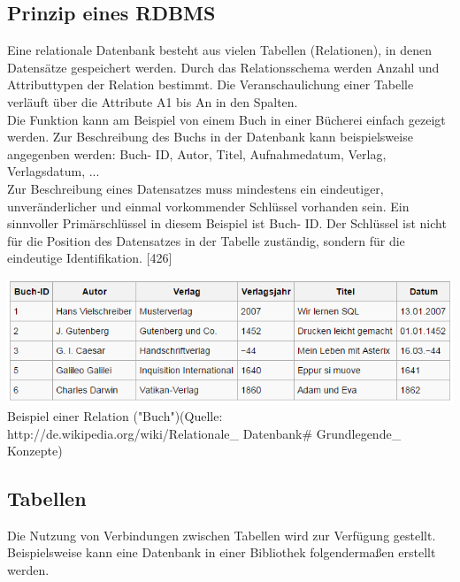 \documentclass[12pt,a4paper]{report}
\begin{document}
\begin{onehalfspace}
\subsection{Prinzip eines RDBMS}
Eine relationale Datenbank besteht aus vielen Tabellen (Relationen), in denen Datensätze gespeichert werden. Durch das Relationsschema werden Anzahl und Attributtypen der Relation bestimmt. Die Veranschaulichung einer Tabelle verläuft über die Attribute A1 bis An in den Spalten.\\

Die Funktion kann am Beispiel von einem Buch in einer Bücherei einfach gezeigt werden. Zur Beschreibung des Buchs in der Datenbank kann beispielsweise angegenben werden: Buch- ID, Autor, Titel, Aufnahmedatum, Verlag, Verlagsdatum, ...
\\Zur Beschreibung eines Datensatzes muss mindestens ein eindeutiger, unveränderlicher und einmal vorkommender Schlüssel vorhanden sein. Ein sinnvoller Primärschlüssel in diesem Beispiel ist Buch- ID. Der Schlüssel ist nicht für die Position des Datensatzes in der Tabelle zuständig, sondern für die eindeutige Identifikation. [426]

\begin{center}
\includegraphics[scale=0.8]{img/relation_DB.png}\\
Beispiel einer Relation ("{}Buch"{})(Quelle: http://de.wikipedia.org/wiki/Relationale\_ Datenbank\# Grundlegende\_ Konzepte)
\end{center}

\subsection{Tabellen}
Die Nutzung von Verbindungen zwischen Tabellen wird zur Verfügung gestellt. Beispielsweise kann eine Datenbank in einer Bibliothek folgendermaßen erstellt werden.\\


\end{onehalfspace}
\end{document}
